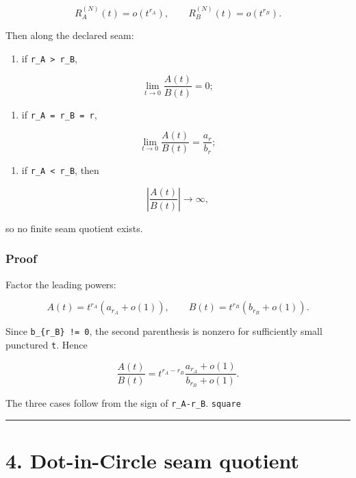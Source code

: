 \[
R_A^{(N)}(t)=o(t^{r_A}),
\qquad
R_B^{(N)}(t)=o(t^{r_B}).
\tag{3.1}
\]

Then along the declared seam:

\begin{enumerate}
\def\labelenumi{\arabic{enumi}.}
\tightlist
\item
  if \texttt{r\_A\ \textgreater{}\ r\_B},
\end{enumerate}

\[
\boxed{\lim_{t\to0}\frac{A(t)}{B(t)}=0;}
\tag{3.2}
\]

\begin{enumerate}
\def\labelenumi{\arabic{enumi}.}
\setcounter{enumi}{1}
\tightlist
\item
  if \texttt{r\_A\ =\ r\_B\ =\ r},
\end{enumerate}

\[
\boxed{\lim_{t\to0}\frac{A(t)}{B(t)}=\frac{a_r}{b_r};}
\tag{3.3}
\]

\begin{enumerate}
\def\labelenumi{\arabic{enumi}.}
\setcounter{enumi}{2}
\tightlist
\item
  if \texttt{r\_A\ \textless{}\ r\_B}, then
\end{enumerate}

\[
\boxed{\left|\frac{A(t)}{B(t)}\right|\to\infty,}
\tag{3.4}
\]

so no finite seam quotient exists.

\hypertarget{proof}{%
\subsubsection{Proof}\label{proof}}

Factor the leading powers:

\[
A(t)=t^{r_A}(a_{r_A}+o(1)),
\qquad
B(t)=t^{r_B}(b_{r_B}+o(1)).
\]

Since \texttt{b\_\{r\_B\}\ !=\ 0}, the second parenthesis is nonzero for sufficiently small
punctured \texttt{t}. Hence

\[
\frac{A(t)}{B(t)}
=t^{r_A-r_B}
\frac{a_{r_A}+o(1)}{b_{r_B}+o(1)}.
\]

The three cases follow from the sign of \texttt{r\_A-r\_B}. \texttt{square}

\begin{center}\rule{0.5\linewidth}{0.5pt}\end{center}

\hypertarget{dot-in-circle-seam-quotient}{%
\section{4. Dot-in-Circle seam quotient}\label{dot-in-circle-seam-quotient}}

